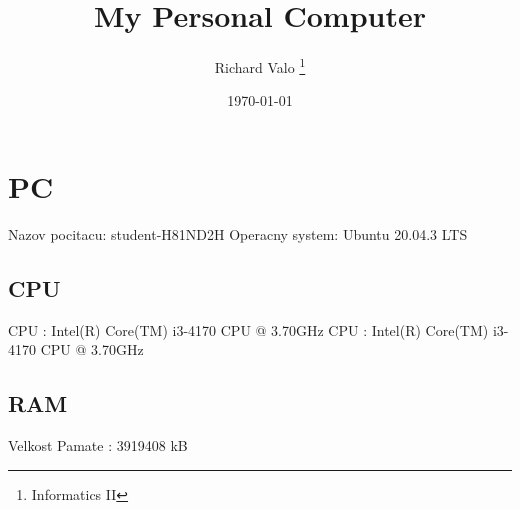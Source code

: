 \documentclass[12pt, letterpaper, twoside]{report}
\title{My Personal Computer}
\author{Richard Valo \thanks{Informatics II}}
\date{\today}
\begin{document}
\maketitle
\chapter{PC}
Nazov pocitacu: student-H81ND2H
Operacny system: Ubuntu 20.04.3 LTS
\section{CPU}
CPU	: Intel(R) Core(TM) i3-4170 CPU @ 3.70GHz
CPU	: Intel(R) Core(TM) i3-4170 CPU @ 3.70GHz
\section{RAM}
Velkost Pamate :        3919408 kB
\end{document}
